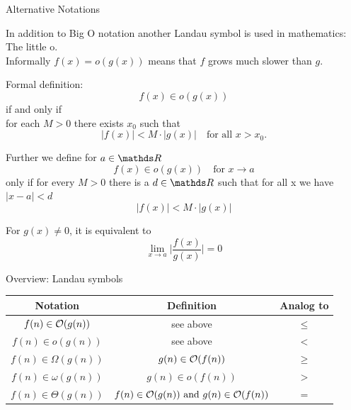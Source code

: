 \documentclass[11pt,compress,t,notes=noshow, xcolor=table]{beamer}
\begin{document}
\begin{vbframe}{Alternative Notations}

In addition to Big O notation another Landau symbol is used in mathematics: The little o.\\
Informally $f(x) = o(g(x))$ means that $f$ grows much slower than $g$.


\lz

\begin{block}{Formal definition:}
  $$
    f(x) \in o(g(x))
  $$
  if and only if\\
  for each $M > 0$ there exists $x_0$ such that
  $$
    |f(x)| < M \cdot |g(x)| \quad \text{for all } x > x_0.
  $$
\end{block}

\framebreak

Further we define for $a \in \R$
$$f(x) \in o(g(x)) \quad \text{for } x \rightarrow a $$
only if for every $M>0$ there is a $d \in \R$
such that for all x we have $|x - a| < d$
$$
|f(x)| < M \cdot |g(x)|
$$


\lz

For $g(x) \neq 0$, it is equivalent to
$$
\lim_{x \rightarrow a} \bigg|\frac{f(x)}{g(x)}\bigg|= 0
$$

\framebreak

\begin{block}{Overview: Landau symbols}
  \vspace*{-0.3cm}
  \begin{center}
    \begin{tabular}{ c | c | c}
      Notation & Definition & Analog to\\
      \hline
      $f(n) \in \mathcal{O}(g(n))$ & see above & $\leq$ \\
      $f(n) \in o(g(n))$ & see above & $<$\\
      $f(n) \in \Omega(g(n))$ & $g(n) \in \mathcal{O}(f(n))$ & $\geq$ \\
      $f(n) \in \omega(g(n))$ & $g(n) \in o(f(n))$ & $>$ \\
      $f(n) \in \Theta(g(n))$ &
      {\footnotesize $f(n) \in \mathcal{O}(g(n)) \text{ and } g(n) \in \mathcal{O}(f(n))$}
      & $=$ \\
    \end{tabular}
  \end{center}

\end{block}


\end{vbframe}
\end{document}
